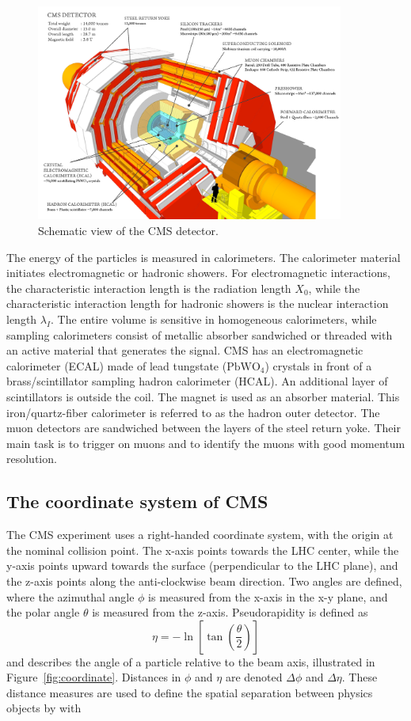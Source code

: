 \begin{figure}[htbp]
  \centering
  \includegraphics[width=0.9\textwidth]{plots/chapter3/cms_layered.png}
  \caption{Schematic view of the CMS detector.}
  \label{fig:cms}
\end{figure}

The energy of the particles is measured in calorimeters. The calorimeter material initiates electromagnetic or hadronic showers. For electromagnetic interactions, the characteristic interaction length is the radiation length $X_0$, while the characteristic interaction length for hadronic showers is the nuclear interaction length $\lambda_I$. The entire volume is sensitive in homogeneous calorimeters, while sampling calorimeters consist of metallic absorber sandwiched or threaded with an active material that generates the signal. CMS has an electromagnetic calorimeter (ECAL) made of lead tungstate ($\text{PbWO}_{4}$) crystals in front of a brass/scintillator sampling hadron calorimeter (HCAL). An additional layer of scintillators is outside the coil. The magnet is used as an absorber material. This iron/quartz-fiber calorimeter is referred to as the hadron outer detector. The muon detectors are sandwiched between the layers of the steel return yoke. Their main task is to trigger on muons and to identify the muons with good momentum resolution.

\subsection{The coordinate system of CMS}
The CMS experiment uses a right-handed coordinate system, with the origin at the nominal collision point. The x-axis points towards the LHC center, while the y-axis points upward towards the surface (perpendicular to the LHC plane), and the z-axis points along the anti-clockwise beam direction. Two angles are defined, where the azimuthal angle $\phi$ is measured from the x-axis in the x-y plane, and the polar angle $\theta$ is measured from the z-axis. Pseudorapidity is defined as
%
\begin{equation}
  \eta=-\ln \left[\tan \left(\frac{\theta}{2}\right)\right]
\end{equation}
%
and describes the angle of a particle relative to the beam axis, illustrated in Figure~\ref{fig:coordinate}. Distances in $\phi$ and $\eta$ are denoted $\Delta\phi$ and $\Delta\eta$. These distance measures are used to define the spatial separation between physics objects by \dr with

